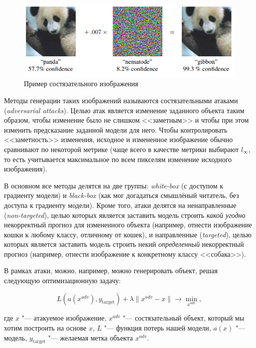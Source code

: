 \documentclass[12pt,a4paper]{article}
\begin{document}
\begin{center}
	\begin{figure}[!htb]
		\centering
		\includegraphics[width=0.9\linewidth]{adversarial_attack.png}
		\caption{Пример состязательного изображения}
	\end{figure}
\end{center}


\par Методы генерации таких изображений называются состязательными атаками (\emph{adversarial attacks}). Целью атак является изменение заданного объекта таким образом, чтобы изменение было не слишком <<заметным>> и чтобы при этом изменить предсказание заданной модели для него. Чтобы контролировать <<заметность>> изменения, исходное и измененное изображение обычно сравнивают по некоторой метрике (чаще всего в качестве метрики выбирают $l_{\infty}$, то есть учитывается максимальное по всем пикселям изменение исходного изображения).
\par В основном все методы делятся на две группы: \emph{white-box} (с доступом к градиенту модели) и \emph{black-box} (как мог догадаться смышлёный читатель, без доступа к градиенту модели). Кроме того, атаки делятся на ненаправленные (\emph{non-targeted}), целью которых является заставить модель строить \emph{какой угодно} некорректный прогноз для измененного объекта (например, отнести изображение кошки к любому классу, отличному от кошек), и направленные (\emph{targeted}), целью которых является заставить модель строить некий \emph{определенный} некорректный прогноз (например, отнести изображение к конкретному классу <<собака>>).
\newpage
\par В рамках атаки, можно, например, можно генерировать объект, решая следующую оптимизационную задачу:

$$
L(a(x^{adv}), y_{\text{target}}) + \lambda \lVert x^{adv} - x \rVert \to \min_{x^{adv}},
$$

где $x$ "--- атакуемое изображение, $x^{adv}$ "--- состязательный объект, который мы хотим построить на основе $x$, $L$ "--- функция потерь нашей модели, $a(x)$ "--- модель, $y_{\text{target}}$ "--- желаемая метка объекта $x^{adv}$.
\end{document}
